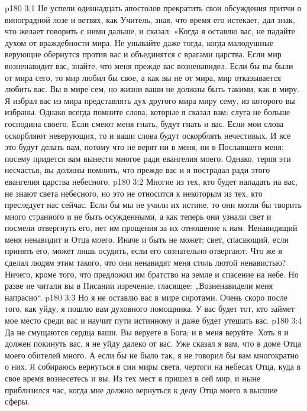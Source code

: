 \vs p180 3:1 Не успели одиннадцать апостолов прекратить свои обсуждения притчи о виноградной лозе и ветвях, как Учитель, зная, что время его истекает, дал знак, что желает говорить с ними дальше, и сказал: «Когда я оставлю вас, не падайте духом от враждебности мира. Не унывайте даже тогда, когда малодушные верующие обернутся против вас и объединятся с врагами царства. Если мир возненавидит вас, знайте, что меня прежде вас возненавидел. Если бы вы были от мира сего, то мир любил бы свое, а как вы не от мира, мир отказывается любить вас. Вы в мире сем, но жизни ваши не должны быть такими, как в миру. Я избрал вас из мира представлять дух другого мира миру сему, из которого вы избраны. Однако всегда помните слова, которые я сказал вам: слуга не больше господина своего. Если смеют меня гнать, будут гнать и вас. Если мои слова оскорбляют неверующих, то и ваши слова будут оскорблять нечестивых. И все это будут делать вам, потому что не верят ни в меня, ни в Пославшего меня; посему придется вам вынести многое ради евангелия моего. Однако, терпя эти несчастья, вы должны помнить, что прежде вас и я пострадал ради этого евангелия царства небесного.
\vs p180 3:2 Многие из тех, кто будет нападать на вас, не знают света небесного, но это не относится к некоторым из тех, кто преследует нас сейчас. Если бы мы не учили их истине, то они могли бы творить много странного и не быть осужденными, а как теперь они узнали свет и посмели отвергнуть его, нет им прощения за их отношение к нам. Ненавидящий меня ненавидит и Отца моего. Иначе и быть не может; свет, спасающий, если принять его, может лишь осудить, если его сознательно отвергают. Что же я сделал людям этим такого, что они ненавидят меня столь лютой ненавистью? Ничего, кроме того, что предложил им братство на земле и спасение на небе. Но разве не читали вы в Писании изречение, гласящее: „Возненавидели меня напрасно“.
\vs p180 3:3 Но я не оставлю вас в мире сиротами. Очень скоро после того, как уйду, я пошлю вам духовного помощника. У вас будет тот, кто займет мое место среди вас и научит пути истинному и даже будет утешать вас.
\vs p180 3:4 Да не смущаются сердца ваши. Вы веруете в Бога; и в меня веруйте. Хоть я и должен покинуть вас, я не уйду далеко от вас. Уже сказал я вам, что в доме Отца моего обителей много. А если бы не было так, я не говорил бы вам многократно о них. Я собираюсь вернуться в сии миры света, чертоги на небесах Отца, куда в свое время вознесетесь и вы. Из тех мест я пришел в сей мир, и ныне приблизился час, когда мне должно вернуться к делу Отца моего в высшие сферы.
